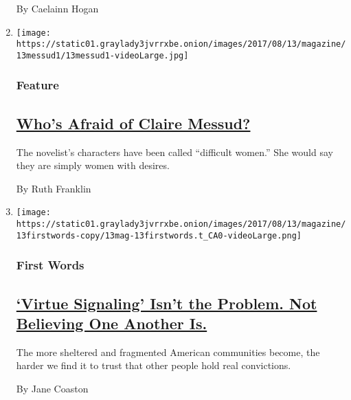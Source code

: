 \begin{enumerate}
  By Caelainn Hogan
\item
  \texttt{[image: https://static01.graylady3jvrrxbe.onion/images/2017/08/13/magazine/13messud1/13messud1-videoLarge.jpg]}

  \hypertarget{feature-2}{%
  \subsubsection{Feature}\label{feature-2}}

  \hypertarget{whos-afraid-of-claire-messud}{%
  \subsection{\texorpdfstring{\href{/2017/08/10/magazine/whos-afraid-of-claire-messud.html}{Who's
  Afraid of Claire
  Messud?}}{Who's Afraid of Claire Messud?}}\label{whos-afraid-of-claire-messud}}

  The novelist's characters have been called ``difficult women.'' She
  would say they are simply women with desires.

  By Ruth Franklin
\item
  \texttt{[image: https://static01.graylady3jvrrxbe.onion/images/2017/08/13/magazine/13firstwords-copy/13mag-13firstwords.t\_CA0-videoLarge.png]}

  \hypertarget{first-words}{%
  \subsubsection{First Words}\label{first-words}}

  \hypertarget{virtue-signaling-isnt-the-problem-not-believing-one-another-is}{%
  \subsection{\texorpdfstring{\href{/2017/08/08/magazine/virtue-signaling-isnt-the-problem-not-believing-one-another-is.html}{`Virtue
  Signaling' Isn't the Problem. Not Believing One Another
  Is.}}{`Virtue Signaling' Isn't the Problem. Not Believing One Another Is.}}\label{virtue-signaling-isnt-the-problem-not-believing-one-another-is}}

  The more sheltered and fragmented American communities become, the
  harder we find it to trust that other people hold real convictions.

  By Jane Coaston
\end{enumerate}

